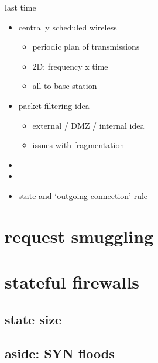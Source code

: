 \date{}
\title{}
\date{}

\begin{frame}
    \titlepage
\end{frame}

\begin{frame}{last time}
    \begin{itemize}
    \item centrally scheduled wireless
        \begin{itemize}
        \item periodic plan of transmissions
        \item 2D: frequency x time
        \item all to base station
        \end{itemize}
    \item packet filtering idea
        \begin{itemize}
        \item external / DMZ / internal idea
        \item issues with fragmentation
        \end{itemize}
    \item {}
    \item {}
    \item state and `outgoing connection' rule
    \end{itemize}
\end{frame}

\section{request smuggling}


\section{stateful firewalls}


\subsection{state size}


\subsection{aside: SYN floods}


